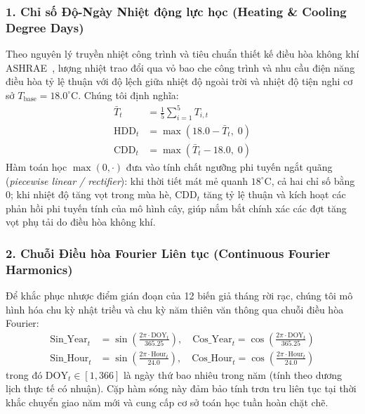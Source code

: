 \subsubsection{1. Chỉ số Độ-Ngày Nhiệt động lực học (Heating \& Cooling Degree Days)}
Theo nguyên lý truyền nhiệt công trình và tiêu chuẩn thiết kế điều hòa không khí ASHRAE~\cite{ashrae2021fundamentals}, lượng nhiệt trao đổi qua vỏ bao che công trình và nhu cầu điện năng điều hòa tỷ lệ thuận với độ lệch giữa nhiệt độ ngoài trời và nhiệt độ tiện nghi cơ sở $T_{\text{base}} = 18.0^\circ\text{C}$. Chúng tôi định nghĩa:
\begin{align}
    \bar{T}_t &= \frac{1}{5} \sum_{i=1}^5 T_{i, t} \\
    \text{HDD}_t &= \max\left(18.0 - \bar{T}_t, \; 0\right) \\
    \text{CDD}_t &= \max\left(\bar{T}_t - 18.0, \; 0\right)
\end{align}
Hàm toán học $\max(0, \cdot)$ đưa vào tính chất ngưỡng phi tuyến ngắt quãng (\textit{piecewise linear / rectifier}): khi thời tiết mát mẻ quanh $18^\circ\text{C}$, cả hai chỉ số bằng 0; khi nhiệt độ tăng vọt trong mùa hè, $\text{CDD}_t$ tăng tỷ lệ thuận và kích hoạt các phản hồi phi tuyến tính của mô hình cây, giúp nắm bắt chính xác các đợt tăng vọt phụ tải do điều hòa không khí.

\subsubsection{2. Chuỗi Điều hòa Fourier Liên tục (Continuous Fourier Harmonics)}
Để khắc phục nhược điểm gián đoạn của 12 biến giả tháng rời rạc, chúng tôi mô hình hóa chu kỳ nhật triều và chu kỳ năm thiên văn thông qua chuỗi điều hòa Fourier:
\begin{align}
    \text{Sin\_Year}_t &= \sin\left(\frac{2\pi \cdot \text{DOY}_t}{365.25}\right), \quad \text{Cos\_Year}_t = \cos\left(\frac{2\pi \cdot \text{DOY}_t}{365.25}\right) \\
    \text{Sin\_Hour}_t &= \sin\left(\frac{2\pi \cdot \text{Hour}_t}{24.0}\right), \quad \text{Cos\_Hour}_t = \cos\left(\frac{2\pi \cdot \text{Hour}_t}{24.0}\right)
\end{align}
trong đó $\text{DOY}_t \in [1, 366]$ là ngày thứ bao nhiêu trong năm (tính theo dương lịch thực tế có nhuận). Cặp hàm sóng này đảm bảo tính trơn tru liên tục tại thời khắc chuyển giao năm mới và cung cấp cơ sở toán học tuần hoàn chặt chẽ.

